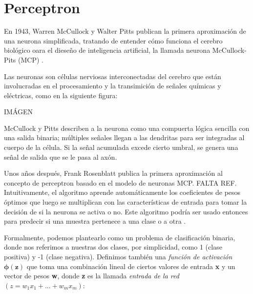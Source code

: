 \section{Perceptron}
En 1943, Warren McCullock y Walter Pitts publican la primera aproximación de una
neurona simplificada, tratando de entender cómo funciona el cerebro biológico oara
el dieseño de inteligencia artificial, la llamada neurona McCullock-Pits (MCP)
\cite{python}.

Las neuronas son células nerviosas interconectadas del cerebro que están involucradas
en el procesamiento y la transimición de señales químicas y eléctricas, como en la
siguiente figura:

IMÁGEN

McCullock y Pitts describen a la neurona como una compuerta lógica sencilla con una
salida binaria; múltiples señales llegan a las dendritas para ser integradas al cuerpo
de la célula. Si la señal acumulada excede cierto umbral, se genera una señal de salida
que se le pasa al axón.

Unos años después, Frank Rosenblatt publica la primera aproximación al concepto de
perceptron basado en el modelo de neuronas MCP. FALTA REF. Intuitivamente, el algoritmo
aprende automáticamente los coeficientes de pesos óptimos que luego se multiplican
con las características de entrada para tomar la decisión de si la neurona se activa
o no. Este algoritmo podría ser usado entonces para predecir si una muestra pertenece
a una clase o a otra \cite{python}.

Formalmente, podemos plantearlo como un problema de clasificación binaria, donde nos
referimos a nuestras dos clases, por simplicidad, como 1 (clase positiva) y -1
(clase negativa). Definimos también una \textit{función de activación $\mathbf{\phi (z)}$}
que toma una combinación lineal de ciertos valores de entrada \textbf{x} y un
vector de pesos \textbf{w}, donde \textbf{z} es la llamada \textit{entrada de la red}
$(z = w_1x_1 + ... + w_mx_m)$:

